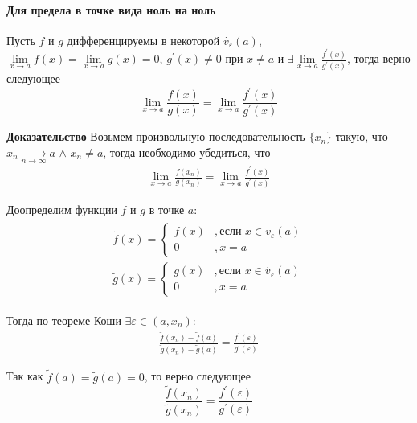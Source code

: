 \documentclass[class=article,a4paper,12pt,crop=false]{standalone}
\begin{document}
\paragraph{Для предела в точке вида ноль на ноль} Пусть $f$ и $g$ дифференцируемы в некоторой $\overset{\cdot}{v}_{\varepsilon}(a)$,
$\lim\limits_{x \rightarrow a}f(x) = \lim\limits_{x \rightarrow a}g(x) = 0$,
$g^{'}(x) \neq 0$ при $x \neq a$ и $\exists \lim\limits_{x \rightarrow a}\frac{f^{'}(x)}{g^{'}(x)}$,
тогда верно следующее
\begin{equation}
    \lim\limits_{x \rightarrow a}\frac{f(x)}{g(x)} = \lim\limits_{x \rightarrow a}\frac{f^{'}(x)}{g^{'}(x)}
\end{equation}

\textbf{Доказательство} Возьмем произвольную последовательность $\{x_n\}$ такую, что
$x_n \underset{n \rightarrow \infty}{\longrightarrow} a$ $\land$ $x_n \neq a$, тогда
необходимо убедиться, что
\begin{eqnarray}
    \lim\limits_{x \rightarrow a}\frac{f(x_n)}{g(x_n)} = \lim\limits_{x \rightarrow a}\frac{f^{'}(x)}{g^{'}(x)}
\end{eqnarray}

Доопределим функции $f$ и $g$ в точке $a$:
\begin{eqnarray}
    \begin{aligned}
        \tilde{f}(x) = \begin{cases}
            f(x)&, \text{если } x \in \overset{\cdot}{v}_{\varepsilon}(a) \\
            0&, x = a
        \end{cases} \\ 
        \tilde{g}(x) = \begin{cases}
            g(x)&, \text{если } x \in \overset{\cdot}{v}_{\varepsilon}(a) \\
            0&, x = a
        \end{cases}
    \end{aligned}
\end{eqnarray}

Тогда по теореме Коши $\exists \varepsilon \in (a, x_n)$:
\begin{eqnarray}
    \frac{\tilde{f}(x_n) - \tilde{f}(a)}{\tilde{g}(x_n) - \tilde{g}(a)} = 
    \frac{f^{'}(\varepsilon)}{g^{'}(\varepsilon)}
\end{eqnarray}

Так как $\tilde{f}(a) = \tilde{g}(a) = 0$, то верно следующее
\begin{equation}
    \frac{\tilde{f}(x_n)}{\tilde{g}(x_n)} = \frac{f^{'}(\varepsilon)}{g^{'}(\varepsilon)}
\end{equation}
\end{document}
